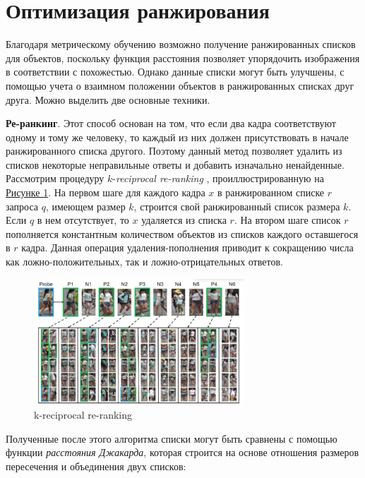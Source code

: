  \section{Оптимизация ранжирования}

 Благодаря метрическому обучению возможно получение ранжированных списков для объектов, поскольку функция расстояния позволяет упорядочить изображения в соответствии с похожестью. Однако данные списки могут быть улучшены, с помощью учета о взаимном положении объектов в ранжированных списках друг друга. Можно выделить две основные техники.

 \textbf{Ре-ранкинг}. Этот способ основан на том, что если два кадра соответствуют одному и тому же человеку, то каждый из них должен присутствовать в начале ранжированного списка другого. Поэтому данный метод позволяет удалить из списков некоторые неправильные ответы и добавить изначально ненайденные. Рассмотрим процедуру $k$-\textit{reciprocal re-ranking} \cite{zhong2017re}, проиллюстрированную на \hyperref[fig:reranking]{Рисунке \ref*{fig:reranking}}. На первом шаге для каждого кадра $x$ в ранжированном списке $r$ запроса $q$, имеющем размер $k$, строится свой ранжированный список размера $k$. Если $q$ в нем отсутствует, то $x$ удаляется из списка $r$. На втором шаге список $r$ пополняется константным количеством объектов из списков каждого оставшегося в $r$ кадра. Данная операция удаления-пополнения приводит к сокращению числа как ложно-положительных, так и ложно-отрицательных ответов.

 \begin{figure}[ht]
     \centering
     \includegraphics[width=0.7\textwidth]{images/closed_world/reranking.png}
     \caption{k-reciprocal re-ranking \cite{zhong2017re}}
     \label{fig:reranking}
 \end{figure}

 Полученные после этого алгоритма списки могут быть сравнены с помощью функции \textit{расстояния Джакарда}, которая строится на основе отношения размеров пересечения и объединения двух списков:

